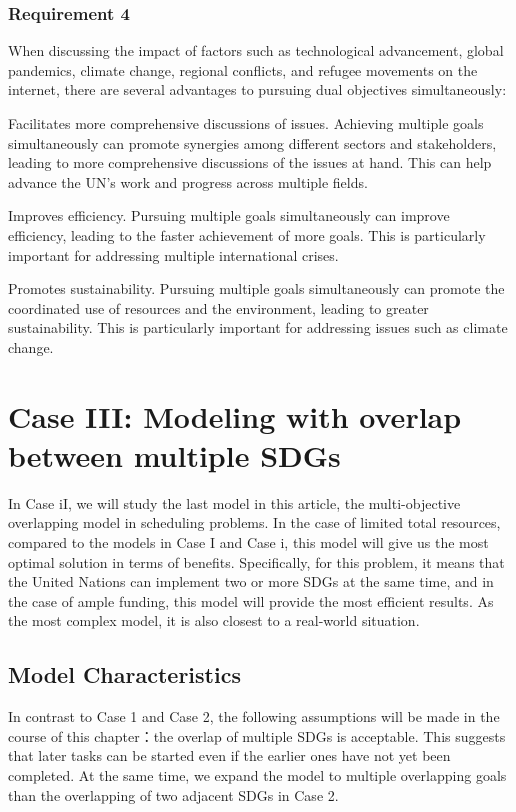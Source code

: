 \documentclass[10pt]{mcmthesis}
\begin{document}
\subsubsection{Requirement 4}

When discussing the impact of factors such as technological advancement, global pandemics, climate change, regional conflicts, and refugee movements on the internet, there are several advantages to pursuing dual objectives simultaneously:

Facilitates more comprehensive discussions of issues. Achieving multiple goals simultaneously can promote synergies among different sectors and stakeholders, leading to more comprehensive discussions of the issues at hand. This can help advance the UN's work and progress across multiple fields.

Improves efficiency. Pursuing multiple goals simultaneously can improve efficiency, leading to the faster achievement of more goals. This is particularly important for addressing multiple international crises.

Promotes sustainability. Pursuing multiple goals simultaneously can promote the coordinated use of resources and the environment, leading to greater sustainability. This is particularly important for addressing issues such as climate change.

\section{Case III: Modeling with overlap between multiple SDGs }

In Case iI, we will study the last model in this article, the multi-objective overlapping model in scheduling problems. In the case of limited total resources, compared to the models in Case I and Case i, this model will give us the most optimal solution in terms of benefits.
Specifically, for this problem, it means that the United Nations can implement two or more SDGs at the same time, and in the case of ample funding, this model will provide the most efficient results. As the most complex model, it is also closest to a real-world situation.

\subsection{Model Characteristics}%
In contrast to Case 1 and Case 2, the following assumptions will be made in the course of this chapter：the overlap of multiple SDGs is acceptable. This suggests that later tasks can be started even if the earlier ones have not yet been completed. At the same time, we expand the model to multiple overlapping goals than the overlapping of two adjacent SDGs in Case 2.
\end{document}
